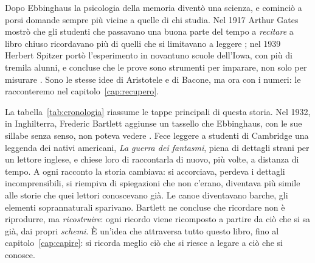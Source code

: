 Dopo Ebbinghaus la psicologia della memoria diventò una scienza, e
cominciò a porsi domande sempre più vicine a quelle di chi studia. Nel
1917 Arthur Gates mostrò che gli studenti che passavano una buona parte
del tempo a \emph{recitare} a libro chiuso ricordavano più di quelli
che si limitavano a leggere \parencite{gates1917}; nel 1939 Herbert
Spitzer portò l'esperimento in novantuno scuole dell'Iowa, con più
di tremila alunni, e concluse che le prove sono strumenti per imparare, non
solo per misurare \parencite{spitzer1939}. Sono le stesse idee di
Aristotele e di Bacone, ma ora con i numeri: le racconteremo nel
capitolo~\ref{cap:recupero}.

La tabella~\ref{tab:cronologia} riassume le tappe principali di questa
storia. Nel 1932, in Inghilterra, Frederic Bartlett aggiunse un tassello che
Ebbinghaus, con le sue sillabe senza senso, non poteva vedere
\parencite{bartlett1932}. Fece leggere a studenti di Cambridge una
leggenda dei nativi americani, \emph{La guerra dei fantasmi}, piena di
dettagli strani per un lettore inglese, e chiese loro di raccontarla di
nuovo, più volte, a distanza di tempo. A ogni racconto la storia
cambiava: si accorciava, perdeva i dettagli incomprensibili, si
riempiva di spiegazioni che non c'erano, diventava più simile alle
storie che quei lettori conoscevano già. Le canoe diventavano barche,
gli elementi soprannaturali sparivano. Bartlett ne concluse che
ricordare non è riprodurre, ma \emph{ricostruire}: ogni ricordo viene
ricomposto a partire da ciò che si sa già, dai propri \emph{schemi}.
È un'idea che attraversa tutto questo libro, fino al
capitolo~\ref{cap:capire}: si ricorda meglio ciò che si riesce a legare
a ciò che si conosce.

